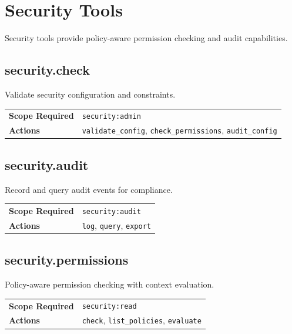 \section{Security Tools}
\label{app:tools:security}

Security tools provide policy-aware permission checking and audit capabilities.

\subsection{security.check}

Validate security configuration and constraints.

\begin{table}[ht]
\centering
\small
\begin{tabularx}{\textwidth}{lX}
    \hline
    \textbf{Scope Required} & \texttt{security:admin} \\
    \textbf{Actions} & \texttt{validate\_config}, \texttt{check\_permissions}, \texttt{audit\_config} \\
    \hline
\end{tabularx}
\end{table}

\subsection{security.audit}

Record and query audit events for compliance.

\begin{table}[ht]
\centering
\small
\begin{tabularx}{\textwidth}{lX}
    \hline
    \textbf{Scope Required} & \texttt{security:audit} \\
    \textbf{Actions} & \texttt{log}, \texttt{query}, \texttt{export} \\
    \hline
\end{tabularx}
\end{table}

\subsection{security.permissions}

Policy-aware permission checking with context evaluation.

\begin{table}[ht]
\centering
\small
\begin{tabularx}{\textwidth}{lX}
    \hline
    \textbf{Scope Required} & \texttt{security:read} \\
    \textbf{Actions} & \texttt{check}, \texttt{list\_policies}, \texttt{evaluate} \\
    \hline
\end{tabularx}
\end{table}

